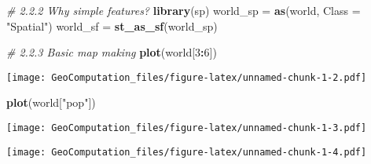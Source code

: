 \documentclass[]{article}
\newenvironment{Shaded}{\begin{snugshade}}{\end{snugshade}}
\newcommand{\CommentTok}[1]{\textcolor[rgb]{0.56,0.35,0.01}{\textit{#1}}}
\newcommand{\DataTypeTok}[1]{\textcolor[rgb]{0.13,0.29,0.53}{#1}}
\newcommand{\DecValTok}[1]{\textcolor[rgb]{0.00,0.00,0.81}{#1}}
\newcommand{\KeywordTok}[1]{\textcolor[rgb]{0.13,0.29,0.53}{\textbf{#1}}}
\newcommand{\NormalTok}[1]{#1}
\newcommand{\OperatorTok}[1]{\textcolor[rgb]{0.81,0.36,0.00}{\textbf{#1}}}
\newcommand{\OtherTok}[1]{\textcolor[rgb]{0.56,0.35,0.01}{#1}}
\newcommand{\StringTok}[1]{\textcolor[rgb]{0.31,0.60,0.02}{#1}}
\begin{document}
\begin{Shaded}
\begin{Highlighting}[]
\CommentTok{# 2.2.2 Why simple features?}
\KeywordTok{library}\NormalTok{(sp)}
\NormalTok{world_sp =}\StringTok{ }\KeywordTok{as}\NormalTok{(world, }\DataTypeTok{Class =} \StringTok{"Spatial"}\NormalTok{)}
\NormalTok{world_sf =}\StringTok{ }\KeywordTok{st_as_sf}\NormalTok{(world_sp)}

\CommentTok{# 2.2.3 Basic map making}
\KeywordTok{plot}\NormalTok{(world[}\DecValTok{3}\OperatorTok{:}\DecValTok{6}\NormalTok{])}
\end{Highlighting}
\end{Shaded}

\texttt{[image: GeoComputation\_files/figure-latex/unnamed-chunk-1-2.pdf]}

\begin{Shaded}
\begin{Highlighting}[]
\KeywordTok{plot}\NormalTok{(world[}\StringTok{"pop"}\NormalTok{])}
\end{Highlighting}
\end{Shaded}

\texttt{[image: GeoComputation\_files/figure-latex/unnamed-chunk-1-3.pdf]}

\begin{Shaded}
\end{Shaded}

\texttt{[image: GeoComputation\_files/figure-latex/unnamed-chunk-1-4.pdf]}

\begin{Shaded}
\end{Shaded}
\end{document}
